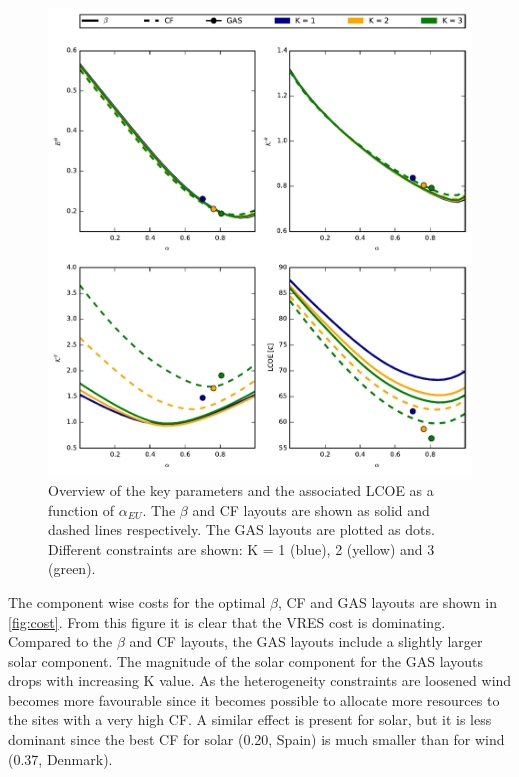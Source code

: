 \documentclass[a4paper, 5p, sort&compress]{elsarticle}%
\begin{document}
\begin{figure}[p]
  \centering
  \includegraphics[width = 2 \columnwidth]{dataSync}
  \caption{Overview of the key parameters and the associated LCOE as a
    function of $\alpha_{EU}$. The $\beta$ %
    and CF %
    layouts are shown as solid and dashed lines respectively. The GAS
    layouts are plotted as dots. Different constraints are shown: K =
    1 (blue), 2 (yellow) and 3 (green).}
  \label{fig:overview}
\end{figure}

The component wise costs for the optimal $\beta$, CF and GAS layouts are
shown in \cref{fig:cost}. From this figure it is clear that the VRES
cost is dominating. Compared to the $\beta$ and CF layouts, the GAS
layouts include a slightly larger solar component. The magnitude of
the solar component for the GAS layouts drops with increasing K
value. As the heterogeneity constraints are loosened wind becomes more
favourable since it becomes possible to allocate more resources to the
sites with a very high CF. A similar effect is present for solar, but
it is less dominant since the best CF for solar (0.20, Spain) is much
smaller than for wind (0.37, Denmark).
\end{document}
